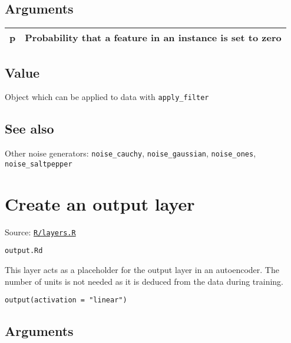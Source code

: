 \hypertarget{arguments}{\subsection{\texorpdfstring{\protect\hyperlink{arguments}{}Arguments}{Arguments}}\label{arguments}}

\begin{longtable}[c]{@{}>{\small}p{3cm}>{\raggedright}p{12.5cm}@{}}
\toprule
p & Probability that a feature in an instance is set to
zero\tabularnewline
\bottomrule
\end{longtable}

\hypertarget{value}{\subsection{\texorpdfstring{\protect\hyperlink{value}{}Value}{Value}}\label{value}}

Object which can be applied to data with \texttt{apply\_filter}

\hypertarget{see-also}{\subsection{\texorpdfstring{\protect\hyperlink{see-also}{}See
also}{See also}}\label{see-also}}

Other noise generators: \texttt{noise\_cauchy},
\texttt{noise\_gaussian}, \texttt{noise\_ones},
\texttt{noise\_saltpepper}

\section{Create an output layer}\label{create-an-output-layer}

Source:
\href{https://github.com/fdavidcl/ruta/blob/master/R/layers.R}{\texttt{R/layers.R}}

\texttt{output.Rd}

This layer acts as a placeholder for the output layer in an autoencoder.
The number of units is not needed as it is deduced from the data during
training.

\begin{verbatim}
output(activation = "linear")
\end{verbatim}

\hypertarget{arguments}{\subsection{\texorpdfstring{\protect\hyperlink{arguments}{}Arguments}{Arguments}}\label{arguments}}

